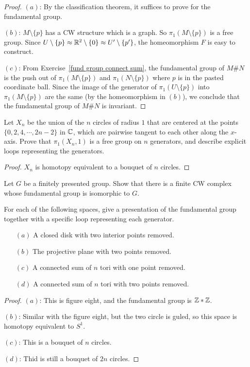 \begin{proof}
$(a)$: By the classification theorem, it suffices to prove for the fundamental group.\par
$(b)$: $M\setminus\{p\}$ has a CW structure which is a graph. So $\pi_1(M\setminus\{p\})$ is a free group. Since $U\setminus\{p\}\approx\mathbb{R}^2\setminus\{0\}\approx U'\setminus\{p'\}$, the homeomorphism $F$ is easy to construct.\par
$(c)$: From Exercise~\ref{fund group connect sum}, the fundamental group of $M\#N$ is the push out of $\pi_1(M\setminus\{p\})$ and $\pi_1(N\setminus\{p\})$ where $p$ is in the pasted coordinate ball. Since the image of the generator of $\pi_1(U\setminus\{p\})$ into $\pi_1(M\setminus\{p\})$ are the same (by the homeomorphism in $(b)$), we conclude that the fundamental group of $M\#N$ is invariant.
\end{proof}
\begin{exercise}
Let $X_n$ be the union of the $n$ circles of radius $1$ that are centered at the points $\{0,2,4,\cdots,2n-2\}$ in $\mathbb{C}$, which are pairwise tangent to each other along the $x$-axis. Prove that $\pi_1(X_n,1)$ is a free group on $n$ generators, and describe explicit loops representing the generators.
\end{exercise}
\begin{proof}
$X_n$ is homotopy equivalent to a bouquet of $n$ circles.
\end{proof}
\begin{exercise}
Let $G$ be a finitely presented group. Show that there is a finite CW complex whose fundamental group is isomorphic to $G$.
\end{exercise}
\begin{exercise}
For each of the following spaces, give a presentation of the fundamental group together with a specific loop representing each generator.
\begin{itemize}
\item[$(a)$] A closed disk with two interior points removed.
\item[$(b)$] The projective plane with two points removed.
\item[$(c)$] A connected sum of $n$ tori with one point removed. 
\item[$(d)$] A connected sum of $n$ tori with two points removed.
\end{itemize}
\end{exercise}
\begin{proof}
$(a)$: This is figure eight, and the fundamental group is $\mathbb{Z}\ast\mathbb{Z}$.\par
$(b)$: Similar with the figure eight, but the two circle is guled, so this space is homotopy equivalent to $S^1$.\par
$(c)$: This is a bouquet of $n$ circles.\par
$(d)$: Thid is still a bouquet of $2n$ circles.
\end{proof}
